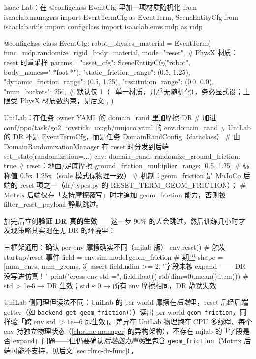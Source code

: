 \begin{codebox}[Python]{Isaac Lab：在 @configclass EventCfg 里加一项材质随机化}
from isaaclab.managers import EventTermCfg as EventTerm, SceneEntityCfg
from isaaclab.utils import configclass
import isaaclab.envs.mdp as mdp

@configclass
class EventCfg:
    robot_physics_material = EventTerm(
        func=mdp.randomize_rigid_body_material,
        mode="reset",                          # PhysX 材质：reset 时重采样
        params={
            "asset_cfg": SceneEntityCfg("robot", body_names=".*foot.*"),
            "static_friction_range": (0.5, 1.25),
            "dynamic_friction_range": (0.5, 1.25),
            "restitution_range": (0.0, 0.0),
            "num_buckets": 250,                # 默认仅 1（=单一材质，几乎无随机化），务必显式设；上限受 PhysX 材质数约束，见后文
        },
    )
\end{codebox}

\begin{codebox}[Python]{UniLab：在任务 owner YAML 的 domain\_rand 里加摩擦 DR}
# 加进 conf/ppo/task/go2_joystick_rough/mujoco.yaml 的 env.domain_rand
# UniLab 的 DR 不是 EventTermCfg，而是任务 DomainRandConfig（dataclass）
# 由 DomainRandomizationManager 在 reset 时分发到后端 set_state(randomization=...)
env:
  domain_rand:
    randomize_ground_friction: true          # reset：地面/足底摩擦
    ground_friction_multiplier_range: [0.5, 1.25]   # 标称值 0.5x~1.25x（scale 模式保物理一致）
# 机制：geom_friction 是 MuJoCo 后端的 reset 项之一（dr/types.py 的 RESET_TERM_GEOM_FRICTION）；
#   Motrix 后端仅在「支持摩擦覆写」时才追加 geom_friction 能力，否则被 filter_reset_payload 静默跳过。
\end{codebox}

\noindent{}加完后立刻\textbf{验证 DR 真的生效}——这一步 90\% 的人会跳过，然后训练几小时才发现策略其实跑在无 DR 的环境里：

\begin{codebox}[Python]{三框架通用：确认 per-env 摩擦确实不同（mjlab 版）}
env.reset()                                   # 触发 startup/reset 事件
field = env.sim.model.geom_friction           # 期望 shape = [num_envs, num_geoms, 3]
assert field.ndim >= 2, "字段未被 expand —— DR 没写进仿真！"
print("cross-env std =", field.float().std(dim=0).mean().item())
# std > 1e-6 → DR 生效；std ≈ 0 → 所有 env 摩擦相同，DR 静默失效
\end{codebox}

\noindent{}UniLab 侧同理但读法不同：UniLab 的 per-world 摩擦在\emph{后端}里，reset 后经后端 getter（如 \verb|backend.get_geom_friction()|）读出 per-world \verb|geom_friction|，同样验「跨 env std $>1\mathrm{e}{-6}$ 即生效」。差异在 UniLab 物理跑在 CPU 多线程、每个 env 持独立物理状态（\cref{ch:rlmc-manager} 的异构架构），不存在 mjlab 的「字段是否 expand」问题——但仍要确认\emph{后端能力声明}里包含 \verb|geom_friction|（Motrix 后端可能不支持，见后文 \cref{sec:rlmc-dr-func}）。

